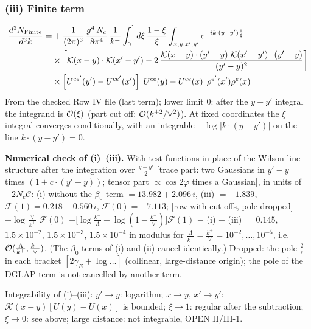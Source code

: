\documentclass[9pt]{article}
\numberwithin{equation}{section}
\begin{document}
\subsubsection{(iii) Finite term}
\begin{align}
\frac{d^{3}N_{\rm Finite}}{d^{3}k}= &  +\frac{1}{(2\pi)^{3}}\,\frac{g^{4}\,N_{c}}{8\pi^{4}}\,\frac{1}{k^{+}}\int_{0}^{1}d\xi\,\frac{1-\xi}{\xi}\int_{x,y,x',y'}e^{-ik\cdot(y-y')\frac{1}{\xi}}\notag\\
&\times\bigg[\mathcal{K}(x-y)\cdot\mathcal{K}(x'-y')-2\,\frac{\mathcal{K}(x-y)\cdot(y'-y)\;\mathcal{K}(x'-y')\cdot(y'-y)}{(y'-y)^{2}}\bigg]\notag\\
&\times\left[U^{ce'}(y') - U^{ce'}(x')\right]\left[U^{ce}(y) - U^{ce}(x)\right]\rho^{e'}(x')\rho^{e}(x)
\end{align}
{\color{gray}\small From the checked Row IV file (last term); lower limit $0$: after the $y-y'$ integral the integrand is ${\cal O}(\xi)$ (part cut off: ${\cal O}(k^{+2}/\vee^{2})$). At fixed coordinates the $\xi$ integral converges conditionally, with an integrable $-\log|k\cdot(y-y')|$ on the line $k\cdot(y-y')=0$.}\par
\noindent\textbf{Numerical check of (i)--(iii).} With test functions in place of the Wilson-line structure after the integration over $\frac{y+y'}{2}$ [trace part: two Gaussians in $y'-y$ times $(1+c\cdot(y'-y))$; tensor part $\propto\cos2\varphi$ times a Gaussian], in units of $-2N_{c}\mathcal{C}$: (i) without the $\beta_{0}$ term $=13.982+2.096\,i$, (iii) $=-1.839$, $\mathcal{F}(1)=0.218-0.560\,i$, $\mathcal{F}(0)=-7.113$; [row with cut-offs, pole dropped] $-\log\frac{\vee}{k^{+}}\,\mathcal{F}(0)$ $-\big[\log\frac{k^{+}}{\Lambda}+\log(1-\frac{k^{+}}{\vee})\big]\mathcal{F}(1)$ $-$ (i) $-$ (iii) $=0.145$, $1.5\times10^{-2}$, $1.5\times10^{-3}$, $1.5\times10^{-4}$ in modulus for $\frac{\Lambda}{k^{+}}=\frac{k^{+}}{\vee}=10^{-2},\dots,10^{-5}$, i.e. ${\cal O}(\frac{\Lambda}{k^{+}},\frac{k^{+}}{\vee})$. (The $\beta_{0}$ terms of (i) and (ii) cancel identically.) Dropped: the pole $\frac{2}{\epsilon}$ in each bracket $[2\gamma_{E}+\log\dots]$ (collinear, large-distance origin); the pole of the DGLAP term is not cancelled by another term.\par
\noindent Integrability of (i)--(iii): $y'\to y$: logarithm; $x\to y$, $x'\to y'$: $\mathcal{K}(x-y)[U(y)-U(x)]$ is bounded; $\xi\to1$: regular after the subtraction; $\xi\to0$: see above; large distance: not integrable, OPEN II/III-1.\par\smallskip
\end{document}
